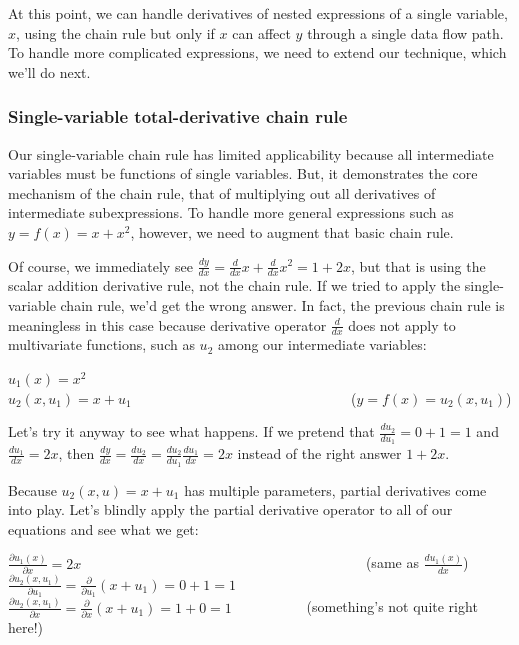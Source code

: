 \documentclass[11pt]{article}
\begin{document}
At this point, we can handle derivatives of nested expressions of a single variable, $x$, using the chain rule but only if $x$ can affect $y$ through a single data flow path. To handle more complicated expressions, we need to extend our technique, which we'll do next.

\subsubsection{Single-variable total-derivative chain rule}

Our single-variable chain rule has limited applicability because all intermediate variables must be functions of single variables. But, it demonstrates the core mechanism of the chain rule, that of multiplying out all derivatives of intermediate subexpressions. To handle more general expressions such as $y = f(x) = x+x^2$, however, we need to augment that basic chain rule.

Of course, we immediately see $\frac{dy}{dx} = \frac{d}{dx}x + \frac{d}{dx}x^2 = 1 + 2x$, but that is using the scalar  addition derivative rule, not the chain rule.  If we tried to apply the single-variable chain rule, we'd get the wrong answer. In fact, the previous chain rule is meaningless in this case because derivative operator $\frac{d}{dx}$ does not apply to multivariate functions, such as $u_2$ among our intermediate variables:

$u_1(x) = x^2$\\
$u_2(x,u_1) = x + u_1$ ~~~~~~~~~~~~~~~~~~~~~~~~~~~~~~ ($y = f(x) = u_2(x,u_1)$)

Let's try it anyway to see what happens. If we pretend that $\frac{du_2}{du_1} = 0 + 1 = 1$ and $\frac{du_1}{dx} = 2x$, then $\frac{dy}{dx} = \frac{du_2}{dx} = \frac{du_2}{du_1} \frac{du_1}{dx} = 2x$ instead of the right answer $1 + 2x$.  

Because $u_2(x,u) = x + u_1$ has multiple parameters, partial derivatives come into play. Let's blindly apply the partial derivative operator to all of our equations and see what we get:

$\frac{\partial u_1(x)}{\partial x} = 2x$ ~~~~~~~~~~~~~~~~~~~~~~~~~~~~~~~~~~~~~~~~(same as $\frac{du_1(x)}{dx}$)\\
$\frac{\partial u_2(x,u_1)}{\partial u_1} = \frac{\partial }{\partial u_1}(x + u_1) = 0 + 1 = 1$\\
$\frac{\partial u_2(x,u_1)}{\partial x} = \frac{\partial }{\partial x}(x + u_1) = 1 + 0 = 1$ ~~~~~~~~~~(something's not quite right here!)\\
\end{document}
